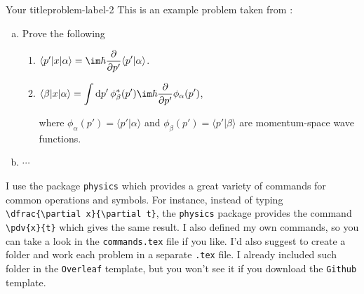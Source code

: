 \documentclass[letterpaper, 11pt]{extarticle}
\begin{document}
\begin{problem}{Your title}{problem-label-2}
This is an example problem taken from \cite{Sakurai2020}:

\begin{enumerate}[(a)]
    \item Prove the following
    \begin{enumerate}[label = (\roman*)]
        \item $\langle p' | x | \alpha \rangle = \im \hbar \displaystyle{\pdv{}{p'} }\langle p' | \alpha \rangle$.

        \item $\langle \beta | x | \alpha \rangle = \displaystyle{\int \dd{p'} \phi_{\beta}^{*} (p') \im \hbar \pdv{}{p'} \phi_{\alpha} (p')}$, 

        \vspace{1ex}

        where $\phi_{\alpha}(p') = \langle p' | \alpha \rangle$ and $\phi_{\beta}(p') = \langle p' | \beta \rangle$ are momentum-space wave functions.
    \end{enumerate}

    \item $\cdots$
\end{enumerate}
\end{problem}

I use the package \texttt{physics} which provides a great variety of commands for common operations and symbols. For instance, instead of typing \verb|\dfrac{\partial x}{\partial t}|, the \texttt{physics} package provides the command \verb|\pdv{x}{t}| which gives the same result. I also defined my own commands, so you can take a look in the \texttt{commands.tex} file if you like. I'd also suggest to create a folder and work each problem in a separate \texttt{.tex} file. I already included such folder in the \texttt{Overleaf} template, but you won't see it if you download the \texttt{Github} template. 






\end{document}
